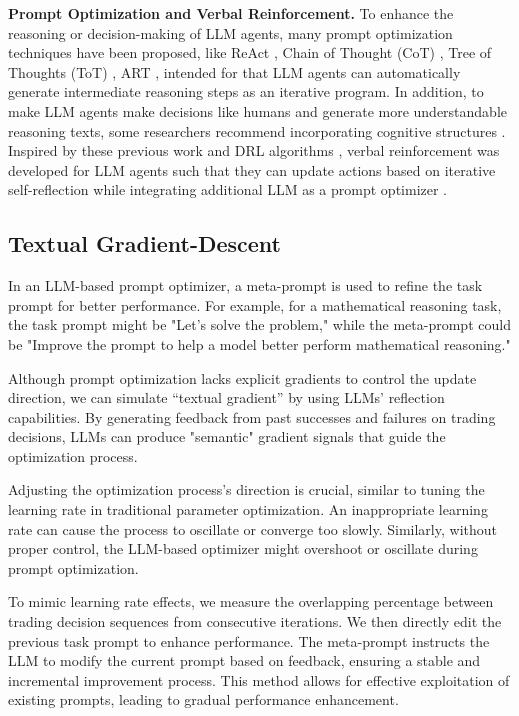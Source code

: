 \textbf{Prompt Optimization and Verbal Reinforcement.} To enhance the reasoning or decision-making of LLM agents, many prompt optimization techniques have been proposed, like ReAct \cite{yao2022react}, Chain of Thought (CoT) \cite{wei2022chain}, Tree of Thoughts (ToT) \cite{yao2024tree}, ART \cite{paranjape2023art}, intended for that LLM agents can automatically generate intermediate reasoning steps as an iterative program. In addition, to make LLM agents make decisions like humans and generate more understandable reasoning texts, some researchers recommend incorporating cognitive structures \cite{hao2023reasoning, zhu2023ghost, sumers2023cognitive, wang2024survey}. Inspired by these previous work and DRL algorithms \cite{kaelbling1996reinforcement, xiong2024personalized, xiong2024dopl, yao2024reinforcement, yao2024control}, verbal reinforcement \cite{yao2023retroformer,shinn2024reflexion, zhang2023controlling,guo2024embodied} was developed for LLM agents such that they can update actions based on iterative self-reflection while integrating additional LLM as a prompt optimizer \cite{pryzant2023automatic, tang2024unleashing}.

\subsection{Textual Gradient-Descent}
\label{Textual Gradient-Descent}
In an LLM-based prompt optimizer, a meta-prompt \cite{pryzant2023automatic, tang2024unleashing} is used to refine the task prompt for better performance. For example, for a mathematical reasoning task, the task prompt might be "Let’s solve the problem," while the meta-prompt could be "Improve the prompt to help a model better perform mathematical reasoning."

Although prompt optimization lacks explicit gradients to control the update direction, we can simulate ``textual gradient'' by using LLMs' reflection capabilities. By generating feedback from past successes and failures on trading decisions, LLMs can produce "semantic" gradient signals that guide the optimization process.

Adjusting the optimization process's direction is crucial, similar to tuning the learning rate in traditional parameter optimization. An inappropriate learning rate can cause the process to oscillate or converge too slowly. Similarly, without proper control, the LLM-based optimizer might overshoot or oscillate during prompt optimization.

To mimic learning rate effects, we measure the overlapping percentage between trading decision sequences from consecutive iterations. We then directly edit the previous task prompt to enhance performance. The meta-prompt instructs the LLM to modify the current prompt based on feedback, ensuring a stable and incremental improvement process. This method allows for effective exploitation of existing prompts, leading to gradual performance enhancement.

